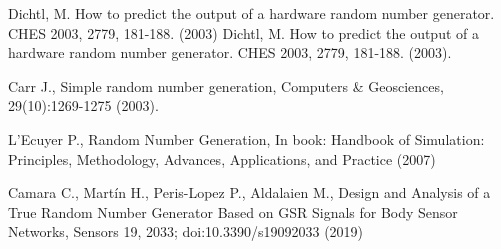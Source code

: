 \documentclass[runningheads]{llncs}
\begin{document}
\begin{thebibliography}{8}
 Dichtl, M. How to predict the output of a hardware random number generator. CHES 2003, 2779, 181-188. (2003) Dichtl, M. How to predict the output of a hardware random number generator. CHES 2003, 2779, 181-188. (2003).

 Carr J., Simple random number generation, Computers \& Geosciences, 29(10):1269-1275 (2003).

 L’Ecuyer P., Random Number Generation, In book: Handbook of Simulation: Principles, Methodology, Advances, Applications, and Practice (2007)

 Camara C., Martín H., Peris-Lopez P., Aldalaien M., Design and Analysis of a True Random Number Generator Based on GSR Signals for Body Sensor Networks, Sensors 19, 2033; doi:10.3390/s19092033 (2019)

\end{thebibliography}
\end{document}
